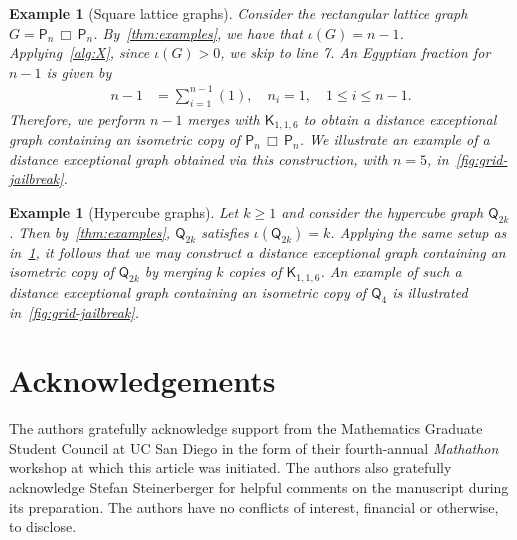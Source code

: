 \documentclass[11pt,a4paper]{article}
\newcommand{\Path}{\mathsf{P}}
\newcommand{\Cube}{\mathsf{Q}}
\newcommand{\Complete}{\mathsf{K}}
\newtheorem{example}[theorem]{Example}
\begin{document}
    \begin{example}[Square lattice graphs]\label{ex:lattice}\normalfont
        Consider the rectangular lattice graph $G=\Path_{n}\,\Box\,\Path_{n}$. By~\cref{thm:examples}, we have that $\iota(G) = n-1$. Applying~\cref{alg:X}, since $\iota(G) > 0$, we skip to line 7. An Egyptian fraction for $n-1$ is given by
            \begin{align*}
                n-1 &= \sum_{i=1}^{n-1} (1),\quad n_i = 1,\quad 1\leq i\leq n-1.
            \end{align*}
        Therefore, we perform $n-1$ merges with $\Complete_{1, 1, 6}$ to obtain a distance exceptional graph containing an isometric copy of $\Path_n\,\Box\,\Path_n$. We illustrate an example of a distance exceptional graph obtained via this construction, with $n=5$, in~\cref{fig:grid-jailbreak}.
    \end{example}

    \begin{example}[Hypercube graphs]\normalfont
        Let $k\ge 1$ and consider the hypercube graph $\Cube_{2k}$. Then by~\cref{thm:examples}, $\Cube_{2k}$ satisfies $\iota(\Cube_{2k}) = k$. Applying the same setup as in~\cref{ex:lattice}, it follows that we may construct a distance exceptional graph containing an isometric copy of $\Cube_{2k}$ by merging $k$ copies of $\Complete_{1, 1, 6}$. An example of such a distance exceptional graph containing an isometric copy of $\Cube_4$ is illustrated in~\cref{fig:grid-jailbreak}.
    \end{example}

    \section*{Acknowledgements}

    The authors gratefully acknowledge support from the Mathematics Graduate Student Council at UC San Diego in the form of their fourth-annual \emph{Mathathon} workshop at which this article was initiated. The authors also gratefully acknowledge Stefan Steinerberger for helpful comments on the manuscript during its preparation. The authors have no conflicts of interest, financial or otherwise, to disclose.
\end{document}
